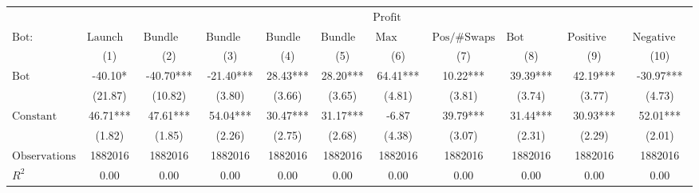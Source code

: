 \begin{tabular}{lcccccccccc}
\hline
 & \multicolumn{10}{c}{$\text{Profit}$} \\
 $\text{Bot}:$ & $\text{Launch Bundle}$ & $\text{Bundle Creator Buy}$ & $\text{Bundle Launch}$ & $\text{Bundle Buy}$ & $\text{Bundle Sell}$ & $\text{Max Same Txn}$ & $\text{Pos/\#Swaps}$ & $\text{Bot Comment}$ & $\text{Positive Bot Comment}$ & $\text{Negative Bot Comment}$ \\
 & (1) & (2) & (3) & (4) & (5) & (6) & (7) & (8) & (9) & (10)\\
\hline
$\text{Bot}$ & -40.10* & -40.70*** & -21.40*** & 28.43*** & 28.20*** & 64.41*** & 10.22*** & 39.39*** & 42.19*** & -30.97*** \\
 & (21.87) & (10.82) & (3.80) & (3.66) & (3.65) & (4.81) & (3.81) & (3.74) & (3.77) & (4.73) \\
$\text{Constant}$ & 46.71*** & 47.61*** & 54.04*** & 30.47*** & 31.17*** & -6.87 & 39.79*** & 31.44*** & 30.93*** & 52.01*** \\
 & (1.82) & (1.85) & (2.26) & (2.75) & (2.68) & (4.38) & (3.07) & (2.31) & (2.29) & (2.01) \\
$\text{Observations}$ & 1882016 & 1882016 & 1882016 & 1882016 & 1882016 & 1882016 & 1882016 & 1882016 & 1882016 & 1882016 \\
$R^2$ & 0.00 & 0.00 & 0.00 & 0.00 & 0.00 & 0.00 & 0.00 & 0.00 & 0.00 & 0.00 \\
\hline
\end{tabular}